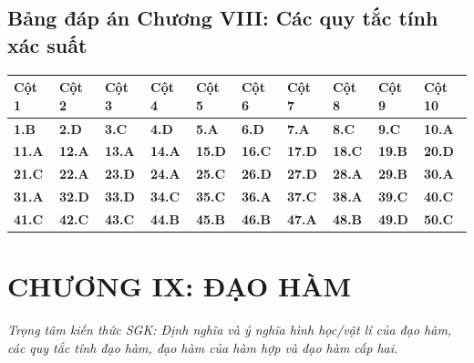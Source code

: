 \documentclass[11pt,a4paper]{article}
\begin{document}
\subsection*{\color{primary} Bảng đáp án Chương VIII: Các quy tắc tính xác suất}
\begin{center}
\renewcommand{\arraystretch}{1.25}
\begin{tabularx}{\textwidth}{*{10}{>{\centering\arraybackslash}X}}
\toprule
\textbf{\color{primary} Cột 1} & \textbf{\color{primary} Cột 2} & \textbf{\color{primary} Cột 3} & \textbf{\color{primary} Cột 4} & \textbf{\color{primary} Cột 5} & \textbf{\color{primary} Cột 6} & \textbf{\color{primary} Cột 7} & \textbf{\color{primary} Cột 8} & \textbf{\color{primary} Cột 9} & \textbf{\color{primary} Cột 10} \\
\midrule
\textbf{1.B} & \textbf{2.D} & \textbf{3.C} & \textbf{4.D} & \textbf{5.A} & \textbf{6.D} & \textbf{7.A} & \textbf{8.C} & \textbf{9.C} & \textbf{10.A} \\
\rowcolor{rowtint} \textbf{11.A} & \textbf{12.A} & \textbf{13.A} & \textbf{14.A} & \textbf{15.D} & \textbf{16.C} & \textbf{17.D} & \textbf{18.C} & \textbf{19.B} & \textbf{20.D} \\
\textbf{21.C} & \textbf{22.A} & \textbf{23.D} & \textbf{24.A} & \textbf{25.C} & \textbf{26.D} & \textbf{27.D} & \textbf{28.A} & \textbf{29.B} & \textbf{30.A} \\
\rowcolor{rowtint} \textbf{31.A} & \textbf{32.D} & \textbf{33.D} & \textbf{34.C} & \textbf{35.C} & \textbf{36.A} & \textbf{37.C} & \textbf{38.A} & \textbf{39.C} & \textbf{40.C} \\
\textbf{41.C} & \textbf{42.C} & \textbf{43.C} & \textbf{44.B} & \textbf{45.B} & \textbf{46.B} & \textbf{47.A} & \textbf{48.B} & \textbf{49.D} & \textbf{50.C} \\
\bottomrule
\end{tabularx}
\end{center}\vspace{10pt}
\section*{\color{primary} CHƯƠNG IX: ĐẠO HÀM}
\textit{Trọng tâm kiến thức SGK: Định nghĩa và ý nghĩa hình học/vật lí của đạo hàm, các quy tắc tính đạo hàm, đạo hàm của hàm hợp và đạo hàm cấp hai.}\par\vspace{4pt}
\end{document}
